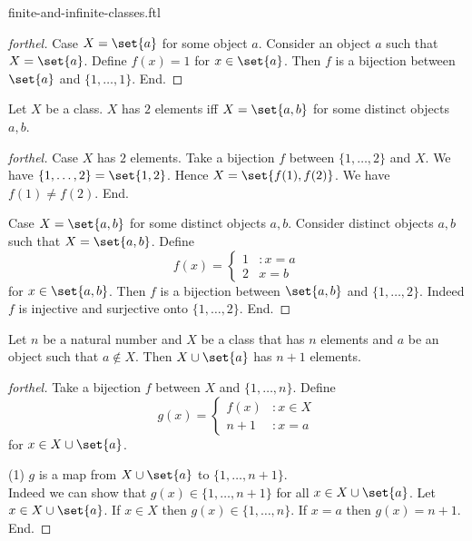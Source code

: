 \documentclass{naproche-library}
\begin{document}
\begin{smodule}{finite-and-infinite-classes.ftl}
\begin{proof}[forthel]
    Case $X = \set{a}$ for some object $a$.
      Consider an object $a$ such that $X = \set{a}$.
      Define $f(x) = 1$ for $x \in \set{a}$.
    Then $f$ is a bijection between $\set{a}$ and $\{ 1, \dots, 1 \}$.
    End.
  \end{proof}

  \begin{proposition}[forthel,id=FOUNDATIONS_14_3468912675458910]
    Let $X$ be a class.
    $X$ has $2$ elements iff $X = \set{a, b}$ for some distinct objects $a, b$.
  \end{proposition}
  \begin{proof}[forthel]
    Case $X$ has $2$ elements.
      Take a bijection $f$ between $\{ 1, \dots, 2 \}$ and $X$.
      We have $\{ 1, \dots, 2 \} = \set{1, 2}$.
      Hence $X = \set{f(1), f(2)}$.
      We have $f(1) \neq f(2)$.
    End.

    Case $X = \set{a, b}$ for some distinct objects $a, b$.
      Consider distinct objects $a, b$ such that $X = \set{a, b}$.
      Define \[f(x) =
        \begin{cases}
          1 & : x = a \\
          2 & x = b
        \end{cases}\]
      for $x \in \set{a, b}$.
      Then $f$ is a bijection between $\set{a, b}$ and $\{ 1, \dots, 2 \}$.
      Indeed $f$ is injective and surjective onto $\{ 1, \dots, 2 \}$.
    End.
  \end{proof}

  \begin{proposition}[forthel,id=FOUNDATIONS_14_0615204230800975]
    Let $n$ be a natural number and $X$ be a class that has $n$ elements and $a$ be an object such that $a \notin X$.
    Then $X \cup \set{a}$ has $n + 1$ elements.
  \end{proposition}
  \begin{proof}[forthel]
    Take a bijection $f$ between $X$ and $\{ 1, \dots, n \}$.
    Define \[g(x) =
      \begin{cases}
        f(x)  & : x \in X \\
        n + 1 & : x = a
      \end{cases}\]
    for $x \in X \cup \set{a}$.

    (1) $g$ is a map from $X \cup \set{a}$ to $\{ 1, \dots, n + 1 \}$. \\
    Indeed we can show that $g(x) \in \{ 1, \dots, n + 1 \}$ for all $x \in X \cup \set{a}$.
      Let $x \in X \cup \set{a}$.
      If $x \in X$ then $g(x) \in \{ 1, \dots, n \}$.
      If $x = a$ then $g(x) = n + 1$.
    End.


\end{proof}
\end{smodule}
\end{document}
